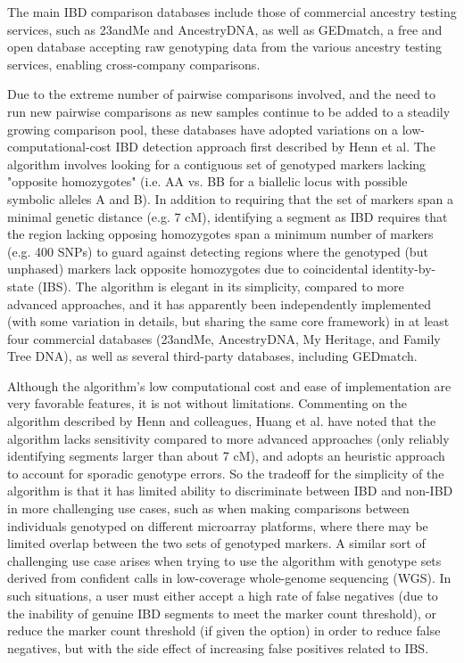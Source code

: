 \documentclass{article}
\begin{document}
The main IBD comparison databases include those of commercial ancestry testing services, such as 23andMe and AncestryDNA, as well as GEDmatch, a free and open database accepting raw genotyping data from the various ancestry testing services, enabling cross-company comparisons.\citep{GEDmatch}

Due to the extreme number of pairwise comparisons involved, and the need to run new pairwise comparisons as new samples continue to be added to a steadily growing comparison pool, these databases have adopted variations on a low-computational-cost IBD detection approach first described by Henn et al.\citep{23andMe} The algorithm involves looking for a contiguous set of genotyped markers lacking "opposite homozygotes" (i.e. AA vs. BB for a biallelic locus with possible symbolic alleles A and B). In addition to requiring that the set of markers span a minimal genetic distance (e.g. 7 cM), identifying a segment as IBD requires that the region lacking opposing homozygotes span a minimum number of markers (e.g. 400 SNPs) to guard against detecting regions where the genotyped (but unphased) markers lack opposite homozygotes due to coincidental identity-by-state (IBS). The algorithm is elegant in its simplicity, compared to more advanced approaches, and it has apparently been independently implemented (with some variation in details, but sharing the same core framework) in at least four commercial databases (23andMe, AncestryDNA, My Heritage, and Family Tree DNA), as well as several third-party databases, including GEDmatch.

Although the algorithm's low computational cost and ease of implementation are very favorable features, it is not without limitations. Commenting on the algorithm described by Henn and colleagues, Huang et al. have noted that the algorithm lacks sensitivity compared to more advanced approaches (only reliably identifying segments larger than about 7 cM), and adopts an heuristic approach to account for sporadic genotype errors.\citep{speeDB} So the tradeoff for the simplicity of the algorithm is that it has limited ability to discriminate between IBD and non-IBD in more challenging use cases, such as when making comparisons between individuals genotyped on different microarray platforms, where there may be limited overlap between the two sets of genotyped markers. A similar sort of challenging use case arises when trying to use the algorithm with genotype sets derived from confident calls in low-coverage whole-genome sequencing (WGS). In such situations, a user must either accept a high rate of false negatives (due to the inability of genuine IBD segments to meet the marker count threshold), or reduce the marker count threshold (if given the option) in order to reduce false negatives, but with the side effect of increasing false positives related to IBS. 
\end{document}
